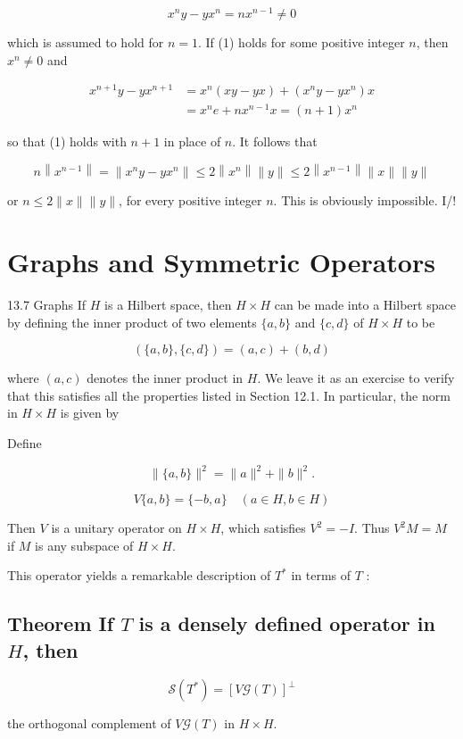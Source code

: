 \documentclass[10pt]{article}
\begin{document}
$$
x^{n} y-y x^{n}=n x^{n-1} \neq 0
$$

which is assumed to hold for $n=1$. If (1) holds for some positive integer $n$, then $x^{n} \neq 0$ and

$$
\begin{aligned}
x^{n+1} y-y x^{n+1} & =x^{n}(x y-y x)+\left(x^{n} y-y x^{n}\right) x \\
& =x^{n} e+n x^{n-1} x=(n+1) x^{n}
\end{aligned}
$$

so that (1) holds with $n+1$ in place of $n$. It follows that

$$
n\left\|x^{n-1}\right\|=\left\|x^{n} y-y x^{n}\right\| \leq 2\left\|x^{n}\right\|\|y\| \leq 2\left\|x^{n-1}\right\|\|x\|\|y\|
$$

or $n \leq 2\|x\|\|y\|$, for every positive integer $n$. This is obviously impossible. I/!

\section{Graphs and Symmetric Operators}
13.7 Graphs If $H$ is a Hilbert space, then $H \times H$ can be made into a Hilbert space by defining the inner product of two elements $\{a, b\}$ and $\{c, d\}$ of $H \times H$ to be

$$
(\{a, b\},\{c, d\})=(a, c)+(b, d)
$$

where $(a, c)$ denotes the inner product in $H$. We leave it as an exercise to verify that this satisfies all the properties listed in Section 12.1. In particular, the norm in $H \times H$ is given by

Define

$$
\|\{a, b\}\|^{2}=\|a\|^{2}+\|b\|^{2} .
$$

$$
V\{a, b\}=\{-b, a\} \quad(a \in H, b \in H)
$$

Then $V$ is a unitary operator on $H \times H$, which satisfies $V^{2}=-I$. Thus $V^{2} M=M$ if $M$ is any subspace of $H \times H$.

This operator yields a remarkable description of $T^{*}$ in terms of $T$ :

\subsection{Theorem If $T$ is a densely defined operator in $H$, then}
$$
\mathscr{S}\left(T^{*}\right)=[V \mathscr{G}(T)]^{\perp}
$$

the orthogonal complement of $V \mathscr{G}(T)$ in $H \times H$.
\end{document}

